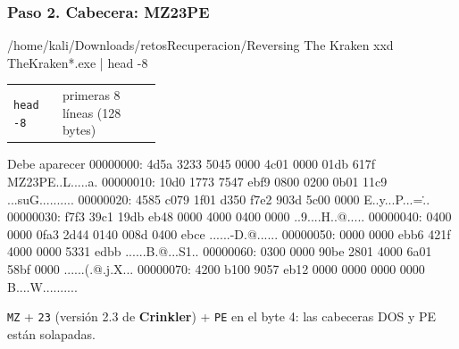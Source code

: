 \documentclass[11pt,a4paper]{article}
\begin{document}
\subsubsection*{Paso 2. Cabecera: MZ23PE}
\begin{comando}{/home/kali/Downloads/retosRecuperacion/Reversing The Kraken}
xxd TheKraken*.exe | head -8
\end{comando}
\begin{tcolorbox}[enhanced, breakable, colback=gray!3, colframe=gray!35, boxrule=0.3pt, arc=1pt, left=4pt, right=4pt, top=2pt, bottom=2pt, fonttitle=\sffamily\scriptsize\bfseries, coltitle=black!70, colbacktitle=gray!10, title={Qué hace cada parte}, attach title to upper, before skip=2pt, after skip=4pt, fontupper=\small]
\par{\renewcommand{\arraystretch}{1.12}\begin{tabularx}{\linewidth}{@{}>{\raggedright\arraybackslash}p{0.33\linewidth}>{\raggedright\arraybackslash}X@{}}
\texttt{head -8} & primeras 8 líneas (128 bytes) \\
\end{tabularx}}
\end{tcolorbox}
\begin{salida}{Debe aparecer}
00000000: 4d5a 3233 5045 0000 4c01 0000 01db 617f  MZ23PE..L.....a.
00000010: 10d0 1773 7547 ebf9 0800 0200 0b01 11c9  ...suG..........
00000020: 4585 c079 1f01 d350 f7e2 903d 5c00 0000  E..y...P...=\...
00000030: f7f3 39c1 19db eb48 0000 4000 0400 0000  ..9....H..@.....
00000040: 0400 0000 0fa3 2d44 0140 008d 0400 ebce  ......-D.@......
00000050: 0000 0000 ebb6 421f 4000 0000 5331 edbb  ......B.@...S1..
00000060: 0300 0000 90be 2801 4000 6a01 58bf 0000  ......(.@.j.X...
00000070: 4200 b100 9057 eb12 0000 0000 0000 0000  B....W..........
\end{salida}
\begin{nota}\texttt{MZ} + \texttt{23} (versión 2.3 de \textbf{Crinkler}) + \texttt{PE} en el byte 4: las cabeceras DOS y PE están solapadas.\end{nota}
\end{document}

